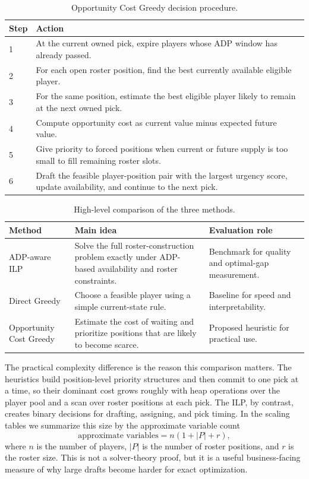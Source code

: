 \documentclass[10pt,a4paper]{article}
\begin{document}
\begin{table}[H]
\centering
\small
\caption{Opportunity Cost Greedy decision procedure.}
\label{tab:ocg_steps}
\begin{tabular}{lp{9.5cm}}
\toprule
Step & Action \\
\midrule
1 & At the current owned pick, expire players whose ADP window has already passed. \\
2 & For each open roster position, find the best currently available eligible player. \\
3 & For the same position, estimate the best eligible player likely to remain at the next owned pick. \\
4 & Compute opportunity cost as current value minus expected future value. \\
5 & Give priority to forced positions when current or future supply is too small to fill remaining roster slots. \\
6 & Draft the feasible player-position pair with the largest urgency score, update availability, and continue to the next pick. \\
\bottomrule
\end{tabular}
\end{table}

\begin{table}[H]
\centering
\caption{High-level comparison of the three methods.}
\begin{tabular}{lp{5.0cm}p{4.7cm}}
\toprule
Method & Main idea & Evaluation role \\
\midrule
ADP-aware ILP & Solve the full roster-construction problem exactly under ADP-based availability and roster constraints. & Benchmark for quality and optimal-gap measurement. \\
Direct Greedy & Choose a feasible player using a simple current-state rule. & Baseline for speed and interpretability. \\
Opportunity Cost Greedy & Estimate the cost of waiting and prioritize positions that are likely to become scarce. & Proposed heuristic for practical use. \\
\bottomrule
\end{tabular}
\end{table}

The practical complexity difference is the reason this comparison matters. The heuristics build position-level priority structures and then commit to one pick at a time, so their dominant cost grows roughly with heap operations over the player pool and a scan over roster positions at each pick. The ILP, by contrast, creates binary decisions for drafting, assigning, and pick timing. In the scaling tables we summarize this size by the approximate variable count
\[
\text{approximate variables}=n(1+|P|+r),
\]
where $n$ is the number of players, $|P|$ is the number of roster positions, and $r$ is the roster size. This is not a solver-theory proof, but it is a useful business-facing measure of why large drafts become harder for exact optimization.
\end{document}
